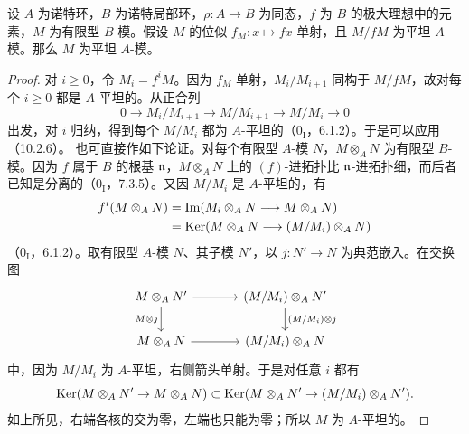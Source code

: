 设 $A$ 为诺特环，$B$ 为诺特局部环，$\rho:A\to B$ 为同态，$f$ 为 $B$ 的极大理想中的元素，$M$ 为有限型 $B$-模。假设 $M$ 的位似 $f_M:x\mapsto fx$ 单射，且 $M/fM$ 为平坦 $A$-模。那么 $M$ 为平坦 $A$-模。
\begin{proof}
对 $i\geq0$，令 $M_i=f^iM$。因为 $f_M$ 单射，$M_i/M_{i+1}$ 同构于 $M/fM$，故对每个 $i\geq0$ 都是 $A$-平坦的。从正合列
\[
0\longrightarrow M_i/M_{i+1}\longrightarrow M/M_{i+1}\longrightarrow M/M_i\longrightarrow0
\]
出发，对 $i$ 归纳，得到每个 $M/M_i$ 都为 $A$-平坦的（$0_{\mathrm I}$，6.1.2）。于是可以应用（10.2.6）。
也可直接作如下论证。对每个有限型 $A$-模 $N$，$M\otimes_AN$ 为有限型 $B$-模。因为 $f$ 属于 $B$ 的根基 $\mathfrak n$，$M\otimes_AN$ 上的 $(f)$-进拓扑比 $\mathfrak n$-进拓扑细，而后者已知是分离的（$0_{\mathrm I}$，7.3.5）。又因 $M/M_i$ 是 $A$-平坦的，有
\[
\begin{aligned}
f^i(M\otimes_AN)
&=\operatorname{Im}(M_i\otimes_AN\longrightarrow M\otimes_AN)\\
&=\operatorname{Ker}(M\otimes_AN\longrightarrow(M/M_i)\otimes_AN)
\end{aligned}
\]
（$0_{\mathrm I}$，6.1.2）。取有限型 $A$-模 $N$、其子模 $N'$，以 $j:N'\to N$ 为典范嵌入。在交换图
\[
\begin{tikzcd}[column sep=large]
M\otimes_AN'\arrow[r]\arrow[d,"M\otimes j"']&(M/M_i)\otimes_AN'\arrow[d,"(M/M_i)\otimes j"]\\
M\otimes_AN\arrow[r]&(M/M_i)\otimes_AN
\end{tikzcd}
\]
中，因为 $M/M_i$ 为 $A$-平坦，右侧箭头单射。于是对任意 $i$ 都有
\[
\operatorname{Ker}(M\otimes_AN'\to M\otimes_AN)
\subset\operatorname{Ker}(M\otimes_AN'\to(M/M_i)\otimes_AN').
\]
如上所见，右端各核的交为零，左端也只能为零；所以 $M$ 为 $A$-平坦的。
\end{proof}

